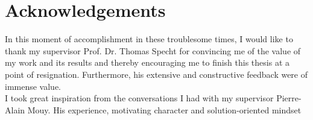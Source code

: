 \chapter*{Acknowledgements}
In this moment of accomplishment in these troublesome times, I would like to thank my supervisor Prof. Dr. Thomas Specht for convincing me of the value of my work and its results and thereby encouraging me to finish this thesis at a point of resignation. Furthermore, his extensive and constructive feedback were of immense value.\\
I took great inspiration from the conversations I had with my supervisor Pierre-Alain Mouy. His experience, motivating character and solution-oriented mindset %
